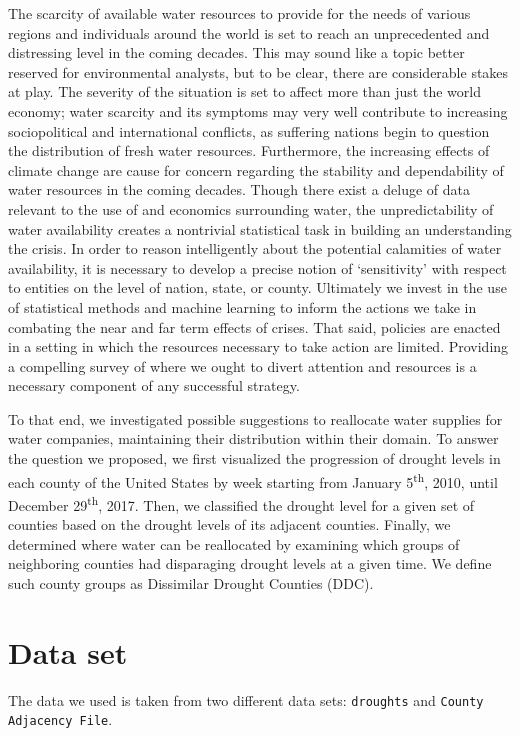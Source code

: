 \documentclass{article}
\begin{document}
The scarcity of available water resources to provide for the needs of various regions and individuals around the world is set to reach an unprecedented and distressing level in the coming decades. This may sound like a topic better reserved for environmental analysts, but to be clear, there are considerable stakes at play. The severity of the situation is set to affect more than just the world economy; water  scarcity  and  its  symptoms  may  very  well  contribute  to  increasing  sociopolitical  and  international conflicts, as suffering nations begin to question the distribution of fresh water resources. Furthermore, the increasing effects of climate change are cause for concern regarding the stability and dependability of water resources in the coming decades. Though there exist a deluge of data relevant to the use of and economics surrounding water, the unpredictability of water availability creates a nontrivial statistical task in building an understanding the crisis. In order to reason intelligently about the potential calamities of water availability, it is necessary  to  develop  a  precise  notion  of  ‘sensitivity’ with  respect  to  entities  on  the  level  of  nation, state, or county.  Ultimately we invest in the use of statistical methods and machine learning to inform the actions we take in combating the near and far term effects of crises.  That said, policies are enacted  in  a  setting  in  which  the  resources  necessary  to  take  action  are  limited.   Providing  a  compelling survey  of  where  we  ought  to  divert  attention  and  resources  is  a  necessary  component  of  any  successful strategy.

To that end, we investigated possible suggestions to reallocate water supplies for water companies, maintaining their distribution within their domain. To answer the question we proposed, we first visualized the progression of drought levels in each county of the United States by week starting from January 5\textsuperscript{th}, 2010, until December 29\textsuperscript{th}, 2017. Then, we classified the drought level for a given set of counties based on the drought levels of its adjacent counties. Finally, we determined where water can be reallocated by examining which groups of neighboring counties had disparaging drought levels at a given time. We define such county groups as Dissimilar Drought Counties (DDC). 

\section{Data set}
The data we used is taken from two different data sets: \texttt{droughts} and \texttt{County Adjacency File}.
\end{document}
